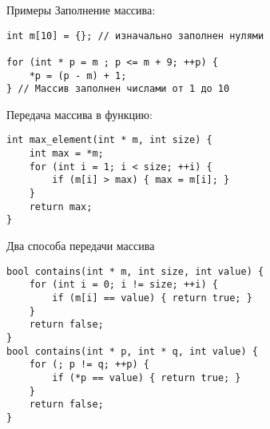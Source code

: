 \documentclass{beamer}
\begin{document}
\begin{frame}[fragile]{Примеры}
Заполнение массива:
\begin{lstlisting}
int m[10] = {}; // изначально заполнен нулями

for (int * p = m ; p <= m + 9; ++p) {
    *p = (p - m) + 1;
} // Массив заполнен числами от 1 до 10
\end{lstlisting}
Передача массива в функцию:
\begin{lstlisting} 
int max_element(int * m, int size) {
    int max = *m; 
    for (int i = 1; i < size; ++i) {
        if (m[i] > max) { max = m[i]; }
    }
    return max;
}
\end{lstlisting}
\end{frame}


\begin{frame}[fragile]{Два способа передачи массива}
\small
\begin{lstlisting}
bool contains(int * m, int size, int value) {
    for (int i = 0; i != size; ++i) {
        if (m[i] == value) { return true; }
    }
    return false;
}
bool contains(int * p, int * q, int value) {
    for (; p != q; ++p) {
        if (*p == value) { return true; }
    }
    return false;
}
\end{lstlisting}
\begin{center}
\end{center}
\end{frame}
\end{document}
